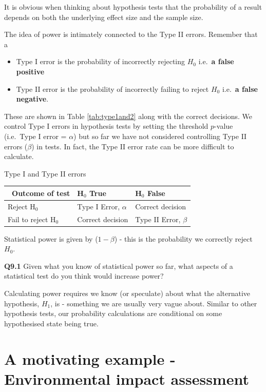 \documentclass[
  oneside]{krantz}
\providecommand{\tightlist}{%
  \setlength{\itemsep}{0pt}\setlength{\parskip}{0pt}}
\begin{document}
It is obvious when thinking about hypothesis tests that the probability of a result depends on both the underlying effect size and the sample size.

The idea of power is intimately connected to the Type II errors. Remember that a

\begin{itemize}
\tightlist
\item
  Type I error is the probability of incorrectly rejecting \(H_0\) i.e.~\textbf{a false positive}
\item
  Type II error is the probability of incorrectly failing to reject \(H_0\) i.e.~\textbf{a false negative}.
\end{itemize}

These are shown in Table \ref{tab:type1and2} along with the correct decisions.
We control Type I errors in hypothesis tests by setting the threshold \(p\)-value (i.e.~Type I error = \(\alpha\)) but so far we have not considered controlling Type II errors (\(\beta\)) in tests. In fact, the Type II error rate can be more difficult to calculate.

\label{tab:type1and2} Type I and Type II errors

\begin{longtable}[]{@{}lll@{}}
\toprule
~Outcome of test & H\(_0\) True & H\(_0\) False\tabularnewline
\midrule
\endhead
Reject H\(_0\) & Type I Error, \(\alpha\) & Correct decision\tabularnewline
Fail to reject H\(_0\) & Correct decision & Type II Error, \(\beta\)\tabularnewline
\bottomrule
\end{longtable}

Statistical power is given by (\(1-\beta\)) - this is the probability we correctly reject \(H_0\).

\textbf{Q9.1} Given what you know of statistical power so far, what aspects of a statistical test do you think would increase power?

Calculating power requires we know (or speculate) about what the alternative hypothesis, \(H_1\), is - something we are usually very vague about. Similar to other hypothesis tests, our probability calculations are conditional on some hypothesised state being true.

\hypertarget{a-motivating-example---environmental-impact-assessment}{%
\section{A motivating example - Environmental impact assessment}\label{a-motivating-example---environmental-impact-assessment}}
\end{document}
